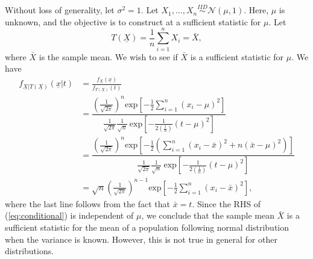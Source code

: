 \documentclass[a4paper,english,12pt]{article}
\begin{document}
\begin{exmp}
	Without loss of generality, let $ \sigma^{2}=1 $. Let $ X_{1},\ldots,X_{n} \stackrel{IID}{\sim} \mathcal{N}(\mu,1) $. Here, $ \mu $ is unknown, and the objective is to construct at a sufficient statistic for $ \mu $. Let
	\begin{equation}
	T(\underline{X})=\frac{1}{n}\sum\limits_{i=1}^{n}X_{i} = \bar{X}\label{eq:T(X)},
	\end{equation}
	where $ \bar{X} $ is the sample mean. We wish to see if $ \bar{X} $ is a sufficient statistic for $ \mu $. We have
	\begin{align}
		f_{\underline{X}|T(\underline{X})}(\underline{x}|t)&=\frac{f_{\underline{X}}(\underline{x})}{f_{T(\underline{X})}(t)}\nonumber\\
		&=\dfrac{\left(\frac{1}{\sqrt{2\pi}}\right)^{n} \text{exp}\left[-\frac{1}{2}\sum\limits_{i=1}^{n}\left(x_{i}-\mu\right)^{2}\right]}{\frac{1}{\sqrt{2\pi}} \frac{1}{\sqrt{n}}~ \text{exp}\left[-\frac{1}{2\left(\frac{1}{n}\right)} \left(t-\mu\right)^{2}\right]}\nonumber\\
		&=\dfrac{\left(\frac{1}{\sqrt{2\pi}}\right)^{n} \text{exp}\left[-\frac{1}{2}\left(\sum\limits_{i=1}^{n}\left(x_{i}-\bar{x}\right)^{2}+n\left(\bar{x}-\mu\right)^{2}\right)\right]}{\frac{1}{\sqrt{2\pi}} \frac{1}{\sqrt{n}}~ \text{exp}\left[-\frac{1}{2\left(\frac{1}{n}\right)} \left(t-\mu\right)^{2}\right]}\nonumber\\
		&=\sqrt{n} \left(\frac{1}{\sqrt{2\pi}}\right)^{n-1} \text{exp}\left[-\frac{1}{2}\sum\limits_{i=1}^{n}\left(x_{i}-\bar{x}\right)^{2}\right],\label{eq:conditional}
		\end{align}
		where the last line follows from the fact that $ \bar{x}=t $. Since the RHS of (\ref*{eq:conditional}) is independent of $ \mu $, we conclude that the sample mean $ \bar{X} $ is a sufficient statistic for the mean of a population following normal distribution when the variance is known. However, this is not true in general for other distributions.
\end{exmp}
\end{document}
